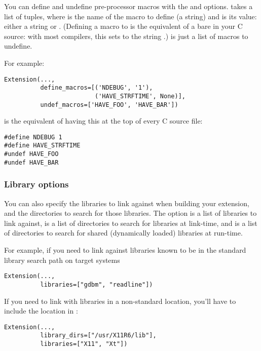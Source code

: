 \documentclass{howto}
\begin{document}
You can define and undefine pre-processor macros with the
 and  options.
 takes a list of  tuples, where
 is the name of the macro to define (a string) and
 is its value: either a string or .  (Defining a
macro  to  is the equivalent of a bare
 in your C source: with most compilers, this sets
 to the string .)   is just
a list of macros to undefine.

For example:

\begin{verbatim}
Extension(...,
          define_macros=[('NDEBUG', '1'),
                         ('HAVE_STRFTIME', None)],
          undef_macros=['HAVE_FOO', 'HAVE_BAR'])
\end{verbatim}

is the equivalent of having this at the top of every C source file:

\begin{verbatim}
#define NDEBUG 1
#define HAVE_STRFTIME
#undef HAVE_FOO
#undef HAVE_BAR
\end{verbatim}


\subsubsection{Library options}

You can also specify the libraries to link against when building your
extension, and the directories to search for those libraries.  The
 option is a list of libraries to link against,
 is a list of directories to search for libraries at 
link-time, and  is a list of directories to 
search for shared (dynamically loaded) libraries at run-time.

For example, if you need to link against libraries known to be in the
standard library search path on target systems

\begin{verbatim}
Extension(...,
          libraries=["gdbm", "readline"])
\end{verbatim}

If you need to link with libraries in a non-standard location, you'll
have to include the location in :

\begin{verbatim}
Extension(...,
          library_dirs=["/usr/X11R6/lib"],
          libraries=["X11", "Xt"])
\end{verbatim}
\end{document}
